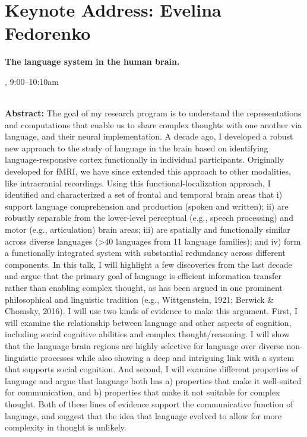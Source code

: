\section{Keynote Address: Evelina Fedorenko}

\begin{center}
\begin{Large}
{\bfseries\Large The language system in the human brain.}
\vspace{1em}\par
\end{Large}

\daydateyear, 9:00--10:10am \vspace{1em}\\
\PlenaryLoc \\
\vspace{1em}\par
\end{center}

\noindent
{\bfseries Abstract:} The goal of my research program is to understand the representations and computations that enable us to share complex thoughts with one another via language, and their neural implementation. A decade ago, I developed a robust new approach to the study of language in the brain based on identifying language-responsive cortex functionally in individual participants. Originally developed for fMRI, we have since extended this approach to other modalities, like intracranial recordings. Using this functional-localization approach, I identified and characterized a set of frontal and temporal brain areas that i) support language comprehension and production (spoken and written); ii) are robustly separable from the lower-level perceptual (e.g., speech processing) and motor (e.g., articulation) brain areas; iii) are spatially and functionally similar across diverse languages (>40 languages from 11 language families); and iv) form a functionally integrated system with substantial redundancy across different components. In this talk, I will highlight a few discoveries from the last decade and argue that the primary goal of language is efficient information transfer rather than enabling complex thought, as has been argued in one prominent philosophical and linguistic tradition (e.g., Wittgenstein, 1921; Berwick & Chomsky, 2016). I will use two kinds of evidence to make this argument. First, I will examine the relationship between language and other aspects of cognition, including social cognitive abilities and complex thought/reasoning. I will show that the language brain regions are highly selective for language over diverse non-linguistic processes while also showing a deep and intriguing link with a system that supports social cognition. And second, I will examine different properties of language and argue that language both has a) properties that make it well-suited for communication, and b) properties that make it not suitable for complex thought. Both of these lines of evidence support the communicative function of language, and suggest that the idea that language evolved to allow for more complexity in thought is unlikely.

